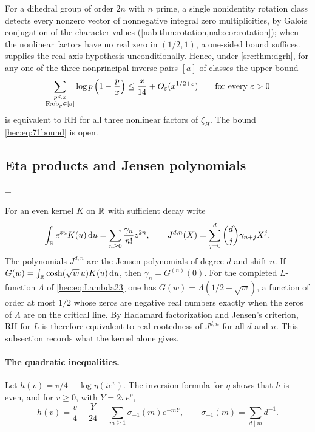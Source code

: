 For a dihedral group of order $2n$ with $n$ prime, a single nonidentity rotation class detects every
nonzero vector of nonnegative integral zero multiplicities, by Galois conjugation of the character values
(\cref{nab:thm:rotation,nab:cor:rotation}); when the nonlinear factors have no real zero in $(1/2,1)$, a
one-sided bound suffices.
 supplies the real-axis hypothesis unconditionally. Hence, under \cref{src:thm:dgrh},
for any one of the three nonprincipal inverse pairs $[a]$ of classes the upper bound
\begin{equation}\label{hec:eq:71bound}
 \sum_{\substack{p\le x\\ \operatorname{Frob}_p\in[a]}}\log p\,\Bigl(1-\frac px\Bigr)\le\frac x{14}+O_\varepsilon(x^{1/2+\varepsilon})
 \qquad\text{for every }\varepsilon>0
\end{equation}
is equivalent to RH for all three nonlinear factors of $\zeta_H$. The bound \eqref{hec:eq:71bound} is open.

\subsection{Eta products and Jensen polynomials}\label{hec:ss:jensen}
{\emergencystretch=\textwidth{}}

For an even kernel $K$ on $\mathbb{R}$ with sufficient decay write
\begin{equation}\label{hec:eq:jensendef}
 \int_{\mathbb{R}} e^{zu}K(u)\,\mathrm{d} u=\sum_{n\ge0}\frac{\gamma_n}{n!}z^{2n},\qquad
 J^{d,n}(X)=\sum_{j=0}^d\binom dj\gamma_{n+j}X^j .
\end{equation}
The polynomials $J^{d,n}$ are the Jensen polynomials of degree $d$ and shift $n$. If
$G(w)=\int_{\mathbb{R}}\cosh(\sqrt w\,u)K(u)\,\mathrm{d} u$, then $\gamma_n=G^{(n)}(0)$. For the completed $L$-function
$\Lambda$ of \eqref{hec:eq:Lambda23} one has $G(w)=\Lambda(1/2+\sqrt w)$, a function of order at most $1/2$
whose zeros are negative real numbers exactly when the zeros of $\Lambda$ are on the critical line. By
Hadamard factorization and Jensen's criterion, RH for $L$ is therefore equivalent to real-rootedness of
$J^{d,n}$ for all $d$ and $n$. This subsection records what the kernel alone gives.

\paragraph{The quadratic inequalities.}
Let $h(v)=v/4+\log\eta(ie^v)$. The inversion formula for $\eta$ shows that $h$ is even, and for $v\ge0$,
with $Y=2\pi e^v$,
\begin{equation}\label{hec:eq:hseries}
 h(v)=\frac v4-\frac Y{24}-\sum_{m\ge1}\sigma_{-1}(m)e^{-mY},\qquad\sigma_{-1}(m)=\sum_{d\mid m}d^{-1}.
\end{equation}


